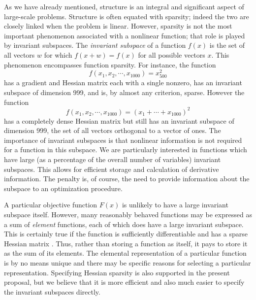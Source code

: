 \documentclass[a4paper]{article}
\begin{document}
As we have already mentioned, structure
is an integral and significant
aspect   of large-scale problems.   Structure  is  often  equated with
sparsity; indeed the   two are  closely linked when   the  problem  is
linear.    However,  sparsity
is  not the  most  important  phenomenon associated with  a  nonlinear
function; that role   is played   by invariant  subspaces.   The  {\em
invariant subspace}
of a  function $f(x)$ is the
set of all vectors $w$ for which  $f(x  + w) =  f(x)$ for all possible
vectors  $x$.  This  phenomenon  encompasses  function  sparsity.
For instance, the function
\[f(x_1 , x_2 ,\cdots,x_{1000}) = x^{2}_{500}\]
has a gradient
and Hessian
matrix  each   with a  single nonzero,   has an  invariant subspace of
dimension 999, and is, by  almost any  criterion, sparse.  However the
function
\[f(x_1 , x_2 ,\cdots,x_{1000}) = (x_1 + \cdots + x_{1000})^2\]
has a  completely   dense Hessian
matrix  but  still has  an invariant subspace
of dimension 999,  the set of  all vectors orthogonal to a  vector  of
ones.   The  importance  of  invariant  subspaces   is that  nonlinear
information is not  required for a  function in this subspace.  We are
particularly interested in functions which have large (as a percentage
of the overall number of variables) invariant subspaces.
This   allows  for efficient   storage and   calculation of derivative
information.  The   penalty  is,  of   course, the   need  to  provide
information about the subspace to an optimization procedure.

A  particular objective function
$F(x)$ is  unlikely  to have  a large
invariant subspace itself.
However, many  reasonably behaved functions may  be expressed as a sum
of {\em element} functions,
each of which does have a large invariant  subspace.
This is certainly true  if the function is sufficiently differentiable
and   has  a sparse  Hessian
matrix   \cite{GrieToin82a}.    Thus, rather  than   storing a
function as  itself, it pays  to store it as the  sum of its elements.
The elemental representation of a particular function  is  by no means
unique and there  may be  specific reasons for  selecting a particular
representation.  Specifying Hessian sparsity
is also supported in the  present proposal, but we  believe that it is
more efficient and also much easier to specify the invariant subspaces
directly.
\end{document}
